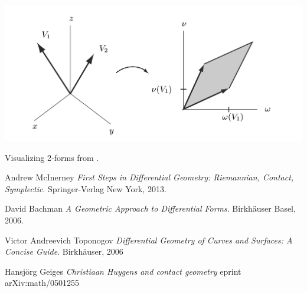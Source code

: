 \documentclass{article}
\begin{document}
\includegraphics[scale=0.5]{form_vis_bachman}

Visualizing 2-forms from \cite{bachman}.


\begin{thebibliography}{9}

{}
  
  Andrew McInerney
  \textit{First Steps in Differential Geometry: Riemannian, Contact, Symplectic}. 
  Springer-Verlag New York, 2013.

  David Bachman
  \textit{A Geometric Approach to Differential Forms}.
  Birkhäuser Basel, 2006.

  Victor Andreevich Toponogov
  \textit{Differential Geometry of Curves and Surfaces: A Concise Guide}. 
  Birkhäuser, 2006

  Hansjörg Geiges
  \textit{Christiaan Huygens and contact geometry}
  eprint arXiv:math/0501255

\end{thebibliography}
\end{document}
